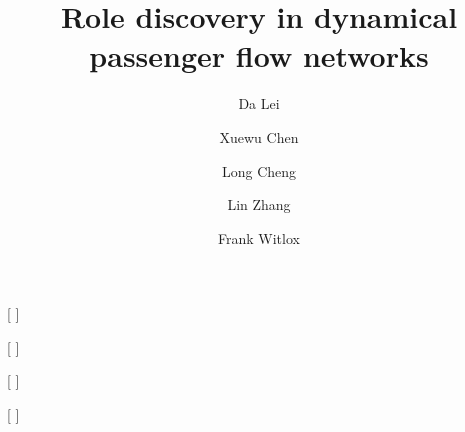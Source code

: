 \documentclass[a4paper,fleqn]{cas-sc}
\begin{document}
\let\WriteBookmarks\relax
\def\floatpagepagefraction{1}
\def\textpagefraction{.001}

\title [mode = title]{Role discovery in dynamical passenger flow networks}                      





\author[1,2,3]{Da Lei}[%
]


\address[1]{Jiangsu Key Laboratory of Urban ITS, Southeast University, Nanjing 211189, China}
\address[2]{Jiangsu Province Collaborative Innovation Center of Modern Urban Traffic Technologies, Southeast University, Nanjing 211189, China}
\address[3]{School of Transportation, Southeast University, Nanjing 211189, China}

\author[1,2,3]{Xuewu Chen}[%
]
\cormark[1]

\author
[4]
{Long Cheng}

\address[4]{Department of Geography, Ghent University, Krijgslaan 281 S8, Ghent 9000, Belgium}

\address[5]{School of Civil Engineering and Transportation, South China University of Technology, Guangzhou, 510641, China}

\author%
[5]
{Lin Zhang}[%
]

\author%
[4]
{Frank Witlox}[%
]


\end{document}
